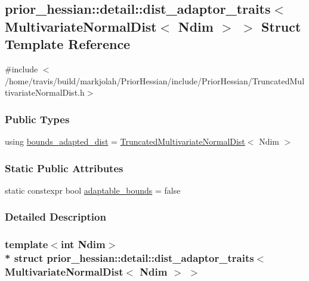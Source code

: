 \hypertarget{structprior__hessian_1_1detail_1_1dist__adaptor__traits_3_01MultivariateNormalDist_3_01Ndim_01_4_01_4}{}\subsection{prior\+\_\+hessian\+:\+:detail\+:\+:dist\+\_\+adaptor\+\_\+traits$<$ Multivariate\+Normal\+Dist$<$ Ndim $>$ $>$ Struct Template Reference}
\label{structprior__hessian_1_1detail_1_1dist__adaptor__traits_3_01MultivariateNormalDist_3_01Ndim_01_4_01_4}


{\ttfamily \#include $<$/home/travis/build/markjolah/\+Prior\+Hessian/include/\+Prior\+Hessian/\+Truncated\+Multivariate\+Normal\+Dist.\+h$>$}

\subsubsection*{Public Types}
\begin{DoxyCompactItemize}
\item 
using \hyperlink{structprior__hessian_1_1detail_1_1dist__adaptor__traits_3_01MultivariateNormalDist_3_01Ndim_01_4_01_4_a08657a114ab62c2fe8d3004dc91d823b}{bounds\+\_\+adapted\+\_\+dist} = \hyperlink{namespaceprior__hessian_a99ef03c8a3e476931d451d6d944ffae5}{Truncated\+Multivariate\+Normal\+Dist}$<$ Ndim $>$
\end{DoxyCompactItemize}
\subsubsection*{Static Public Attributes}
\begin{DoxyCompactItemize}
\item 
static constexpr bool \hyperlink{structprior__hessian_1_1detail_1_1dist__adaptor__traits_3_01MultivariateNormalDist_3_01Ndim_01_4_01_4_a17273f68ee0cf8fb1f56166c08611948}{adaptable\+\_\+bounds} = false
\end{DoxyCompactItemize}


\subsubsection{Detailed Description}
\subsubsection*{template$<$int Ndim$>$\\*
struct prior\+\_\+hessian\+::detail\+::dist\+\_\+adaptor\+\_\+traits$<$ Multivariate\+Normal\+Dist$<$ Ndim $>$ $>$}



